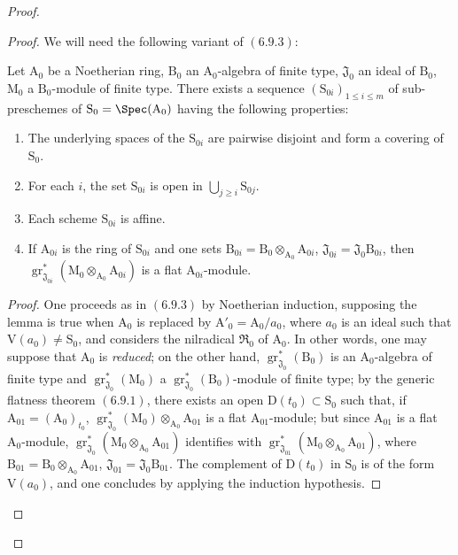 \begin{proof}
\begin{proof}
We will need the following variant of $(6.9.3)$:

\begin{lemma}[11.2.9.5]
\label{IV.11.2.9.5}
Let $\mathrm{A}_0$ be a Noetherian ring, $\mathrm{B}_0$ an $\mathrm{A}_0$-algebra of finite type, $\mathfrak{J}_0$ an ideal of $\mathrm{B}_0$, $\mathrm{M}_0$ a $\mathrm{B}_0$-module of finite type. There exists a sequence $(\mathrm{S}_{0i})_{1\leqslant i\leqslant m}$ of sub-preschemes of $\mathrm{S}_0=\Spec(\mathrm{A}_0)$ having the following properties:
\begin{enumerate}[label=\arabic{enumi}\textsuperscript{o}]
  \item The underlying spaces of the $\mathrm{S}_{0i}$ are pairwise disjoint and form a covering of $\mathrm{S}_0$.
  \item For each $i$, the set $\mathrm{S}_{0i}$ is open in $\bigcup_{j\geqslant i}\mathrm{S}_{0j}$.
  \item Each scheme $\mathrm{S}_{0i}$ is affine.
  \item If $\mathrm{A}_{0i}$ is the ring of $\mathrm{S}_{0i}$ and one sets $\mathrm{B}_{0i}=\mathrm{B}_0\otimes_{\mathrm{A}_0}\mathrm{A}_{0i}$, $\mathfrak{J}_{0i}=\mathfrak{J}_0\mathrm{B}_{0i}$, then $\operatorname{gr}^*_{\mathfrak{J}_{0i}}(\mathrm{M}_0\otimes_{\mathrm{A}_0}\mathrm{A}_{0i})$ is a flat $\mathrm{A}_{0i}$-module.
\end{enumerate}
\end{lemma}

\begin{proof}
One proceeds as in $(6.9.3)$ by Noetherian induction, supposing the lemma is true when $\mathrm{A}_0$ is replaced by $\mathrm{A}'_0=\mathrm{A}_0/a_0$, where $a_0$ is an ideal such that $\mathrm{V}(a_0)\neq\mathrm{S}_0$, and considers the nilradical $\mathfrak{R}_0$ of $\mathrm{A}_0$. In other words, one may suppose that $\mathrm{A}_0$ is \emph{reduced}; on the other hand, $\operatorname{gr}^*_{\mathfrak{J}_0}(\mathrm{B}_0)$ is an $\mathrm{A}_0$-algebra of finite type and $\operatorname{gr}^*_{\mathfrak{J}_0}(\mathrm{M}_0)$ a $\operatorname{gr}^*_{\mathfrak{J}_0}(\mathrm{B}_0)$-module of finite type; by the generic flatness theorem $(6.9.1)$, there exists an open $\mathrm{D}(t_0)\subset\mathrm{S}_0$ such that, if $\mathrm{A}_{01}=(\mathrm{A}_0)_{t_0}$, $\operatorname{gr}^*_{\mathfrak{J}_0}(\mathrm{M}_0)\otimes_{\mathrm{A}_0}\mathrm{A}_{01}$ is a flat $\mathrm{A}_{01}$-module; but since $\mathrm{A}_{01}$ is a flat $\mathrm{A}_0$-module, $\operatorname{gr}^*_{\mathfrak{J}_0}(\mathrm{M}_0\otimes_{\mathrm{A}_0}\mathrm{A}_{01})$ identifies with $\operatorname{gr}^*_{\mathfrak{J}_{01}}(\mathrm{M}_0\otimes_{\mathrm{A}_0}\mathrm{A}_{01})$, where $\mathrm{B}_{01}=\mathrm{B}_0\otimes_{\mathrm{A}_0}\mathrm{A}_{01}$, $\mathfrak{J}_{01}=\mathfrak{J}_0\mathrm{B}_{01}$. The complement of $\mathrm{D}(t_0)$ in $\mathrm{S}_0$ is of the form $\mathrm{V}(a_0)$, and one concludes by applying the induction hypothesis.
\end{proof}


\end{proof}
\end{proof}
